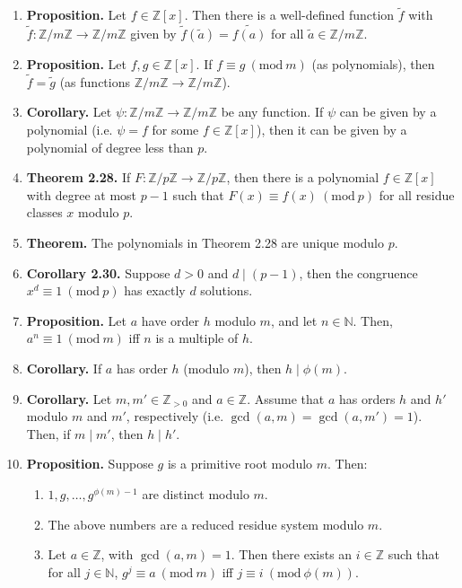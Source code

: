 \documentclass[11pt]{article}
\theoremstyle{definition}
\theoremstyle{named}
\newcommand{\Mod}[1]{\ (\mathrm{mod}\ #1)}
\begin{document}
\begin{enumerate}
    \item \textbf{Proposition. } Let $f \in \mathbb{Z}[x]$. Then there is a well-defined function $\tilde{f}$ with $\tilde{f}: \mathbb{Z}/m\mathbb{Z} \to \mathbb{Z}/m\mathbb{Z}$ given by $\tilde{f}(\tilde{a}) = \tilde{f(a)}$ for all $\tilde{a} \in \mathbb{Z}/m\mathbb{Z}$. 
    \item \textbf{Proposition. } Let $f,g \in \mathbb{Z}[x]$. If $f \equiv g \Mod{m}$ (as polynomials), then $\tilde{f} = \tilde{g}$ (as functions $\mathbb{Z}/m\mathbb{Z} \to \mathbb{Z}/m\mathbb{Z}$). 
    \item \textbf{Corollary. } Let $\psi: \mathbb{Z}/m\mathbb{Z} \to \mathbb{Z}/m\mathbb{Z}$ be any function. If $\psi$ can be given by a polynomial (i.e. $\psi = f$ for some $f \in \mathbb{Z}[x]$), then it can be given by a polynomial of degree less than $p$. 
    \item \textbf{Theorem 2.28. } If $F: \mathbb{Z}/p\mathbb{Z} \to \mathbb{Z}/p\mathbb{Z}$, then there is a polynomial $f \in \mathbb{Z}[x]$ with degree at most $p-1$ such that $F(x) \equiv f(x) \Mod{p}$ for all residue classes $x$ modulo $p$. 
    \item \textbf{Theorem. } The polynomials in Theorem 2.28 are unique modulo $p$. 
    \item \textbf{Corollary 2.30. } Suppose $d>0$ and $d \mid (p-1)$, then the congruence $x^d \equiv 1 \Mod{p}$ has exactly $d$ solutions. 
    \item \textbf{Proposition. } Let $a$ have order $h$ modulo $m$, and let $n \in \mathbb{N}$. Then, $a^n \equiv 1 \Mod{m}$ iff $n$ is a multiple of $h$. 
    \item \textbf{Corollary. } If $a$ has order $h$ (modulo $m$), then $h \mid \phi(m)$. 
    \item \textbf{Corollary. } Let $m,m' \in \mathbb{Z}_{>0}$ and $a \in \mathbb{Z}$. Assume that $a$ has orders $h$ and $h'$ modulo $m$ and $m'$, respectively (i.e. $\gcd(a,m) = \gcd(a,m') = 1$). Then, if $m \mid m'$, then $h \mid h'$. 
    \item \textbf{Proposition. } Suppose $g$ is a primitive root modulo $m$. Then: 
    \begin{enumerate}
        \item $1,g,\dots,g^{\phi(m) - 1}$ are distinct modulo $m$. 
        \item The above numbers are a reduced residue system modulo $m$. 
        \item Let $a \in \mathbb{Z}$, with $\gcd(a,m) = 1$. Then there exists an $i \in \mathbb{Z}$ such that for all $j \in \mathbb{N}$, $g^j \equiv a \Mod{m}$ iff $j \equiv i \Mod{\phi(m)}$. 

\end{enumerate}
\end{enumerate}
\end{document}
